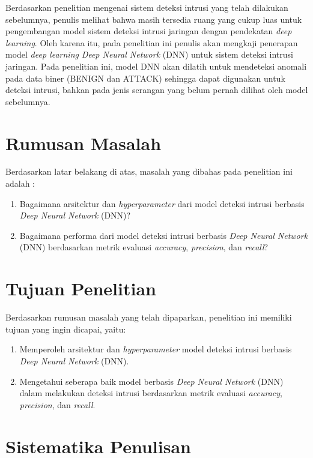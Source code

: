 \documentclass[a4paper,12pt]{report}
\begin{document}
Berdasarkan penelitian mengenai sistem deteksi intrusi yang telah dilakukan sebelumnya, penulis melihat bahwa masih tersedia ruang yang cukup luas untuk pengembangan model sistem deteksi intrusi jaringan dengan pendekatan \textit{deep learning}. Oleh karena itu, pada penelitian ini penulis akan mengkaji penerapan model \textit{deep learning} \textit{Deep Neural Network} (DNN) untuk sistem deteksi intrusi jaringan. Pada penelitian ini, model DNN akan dilatih untuk mendeteksi anomali pada data biner (BENIGN dan ATTACK) sehingga dapat digunakan untuk deteksi intrusi, bahkan pada jenis serangan yang belum pernah dilihat oleh model sebelumnya. 

\section{Rumusan Masalah}

Berdasarkan latar belakang di atas, masalah yang dibahas pada penelitian ini adalah :
\begin{enumerate}
	\item Bagaimana arsitektur dan \textit{hyperparameter} dari model deteksi intrusi berbasis \textit{Deep Neural Network} (DNN)?
	\item Bagaimana performa dari model deteksi intrusi berbasis \textit{Deep Neural Network} (DNN) berdasarkan metrik evaluasi \textit{accuracy}, \textit{precision}, dan \textit{recall}?
\end{enumerate}

\section{Tujuan Penelitian}

Berdasarkan rumusan masalah yang telah dipaparkan, penelitian ini memiliki tujuan yang ingin dicapai, yaitu:
\begin{enumerate}
	\item Memperoleh arsitektur dan \textit{hyperparameter} model deteksi intrusi berbasis \textit{Deep Neural Network} (DNN).
	\item Mengetahui seberapa baik model berbasis \textit{Deep Neural Network} (DNN) dalam melakukan deteksi intrusi berdasarkan metrik evaluasi \textit{accuracy}, \textit{precision}, dan \textit{recall}.
\end{enumerate} 

\section{Sistematika Penulisan}
\end{document}
